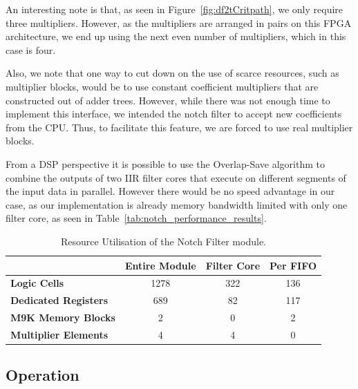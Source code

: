 \documentclass[]{article}
\begin{document}
An interesting note is that, as seen in Figure~\ref{fig:df2tCritpath}, we only require three multipliers. However, as the multipliers are arranged in pairs on this FPGA architecture, we end up using the next even number of multipliers, which in this case is four.

Also, we note that one way to cut down on the use of scarce resources, such as multiplier blocks, would be to use constant coefficient multipliers that are constructed out of adder trees. However, while there was not enough time to implement this interface, we intended the notch filter to accept new coefficients from the CPU.
Thus, to facilitate this feature, we are forced to use real multiplier blocks.

From a DSP perspective it is possible to use the Overlap-Save \cite{overlapsave} algorithm to combine the outputs of two IIR filter cores that execute on different segments of the input data in parallel.
However there would be no speed advantage in our case, as our implementation is already memory bandwidth limited with only one filter core, as seen in Table~\ref{tab:notch_performance_results}.

\begin{table}[tbp]
	\caption{Resource Utilisation of the Notch Filter module.}
	\label{tab:resource_util_notch}
	\begin{center}
		\begin{tabular}{l|ccc}
		\hline

		\hline
											& \textbf{Entire Module} 	& \textbf{Filter Core} 	& \textbf{Per FIFO}\\
		\hline
			\textbf{Logic Cells} 			& 1278 						& 322 					& 136 \\
		\hline
			\textbf{Dedicated Registers}	& 689						& 82 					& 117 \\
		\hline
			\textbf{M9K Memory Blocks}		& 2							& 0 					& 2 \\
		\hline
			\textbf{Multiplier Elements}	& 4							& 4 					& 0 \\
		\hline

		\hline
		\end{tabular}
	\end{center}
\end{table}


\subsection{Operation} %
\label{sub:operation}
\end{document}
